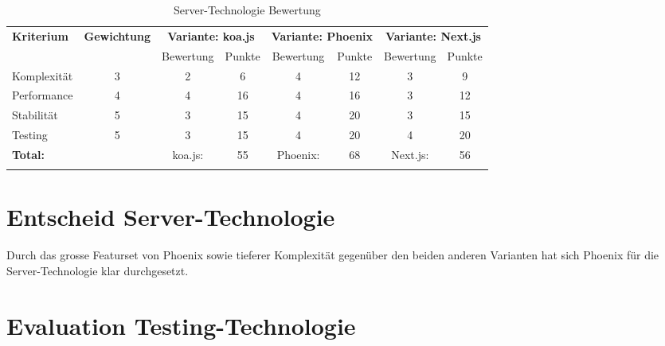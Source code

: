\begin{longtable}[]{@{}p{2cm}ccccccc@{}}
  \toprule
  \textbf{Kriterium} & \textbf{Gewichtung} & \multicolumn{2}{c}{\textbf{Variante: koa.js}} & \multicolumn{2}{c}{\textbf{Variante: Phoenix}} & \multicolumn{2}{c}{\textbf{Variante: Next.js}}\tabularnewline
                     &                     & Bewertung                                     & Punkte                                         & Bewertung                                                     & Punkte & Bewertung & Punkte \tabularnewline
  \midrule
  \endhead
  Komplexität        & 3                   & 2                                             & 6                                              & 4                                                             & 12     & 3         & 9 \tabularnewline
  Performance        & 4                   & 4                                             & 16                                             & 4                                                             & 16     & 3         & 12 \tabularnewline
  Stabilität         & 5                   & 3                                             & 15                                             & 4                                                             & 20     & 3         & 15 \tabularnewline
  Testing            & 5                   & 3                                             & 15                                             & 4                                                             & 20     & 4         & 20 \tabularnewline
  \midrule
  \textbf{Total:}    &                     & koa.js:                                       & 55                                             & Phoenix:                                                      & 68     & Next.js:  & 56 \tabularnewline
  \bottomrule
  \caption{Server-Technologie Bewertung}
\end{longtable}

\section{Entscheid Server-Technologie}\label{entscheid-server-technologie}

Durch das grosse Featurset von Phoenix sowie tieferer Komplexität gegenüber den
beiden anderen Varianten hat sich Phoenix für die Server-Technologie klar
durchgesetzt.

\clearpage
\section{Evaluation Testing-Technologie}\label{evaluation-testing-technologie}

